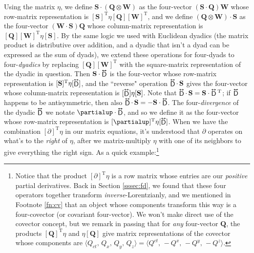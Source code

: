 \documentclass[12pt]{article}
\renewcommand{\vv}[1]{\mathbf{#1}}
\newcommand{\tightoverset}[2]{%
  \mathop{#2}\limits^{\vbox to -.5ex{\kern-0.75ex\hbox{$#1$}\vss}}}
\newcommand{\inlinedy}[1]{\tightoverset{\text{\tiny$\bm\leftrightarrow$}}{#1}}
\begin{document}
Using the matrix $\eta$, we define $\vv S \cdot (\vv Q \otimes \vv W)$ as the four-vector $(\vv S \cdot \vv Q) \vv W$ whose row-matrix representation is $[\vv S]^\mathrm{T} \eta [\vv Q] [\vv W]^\mathrm{T}$, and we define $(\vv Q \otimes \vv W) \cdot \vv S$ as the four-vector $(\vv W \cdot \vv S) \vv Q$ whose column-matrix representation is $[\vv Q] [\vv W]^\mathrm{T} \eta [\vv S]$. By the same logic we used with Euclidean dyadics (the matrix product is distributive over addition, and a dyadic that isn't a dyad can be expressed as the sum of dyads), we extend these operations for four-dyads to four-\emph{dyadics} by replacing $[\vv Q][\vv W]^{\textrm{T}}$ with the square-matrix representation of the dyadic in question. Then $\vv S \cdot \inlinedy{\mathsf{D}}$ is the four-vector whose row-matrix representation is $[\vv S]^{\mathrm{T}} \eta [\inlinedy{\mathsf{D}}]$, and the ``reverse" operation $\inlinedy{\mathsf{D}} \cdot \, \vv S$ gives the four-vector whose column-matrix representation is $[\inlinedy{\mathsf{D}}] \eta [\vv S]$. Note that $\inlinedy{\mathsf{D}} \cdot \, \vv S = \vv S \cdot \inlinedy{\mathsf{D}} {}^\mathrm{T}$; if $\inlinedy{\mathsf{D}}$ happens to be antisymmetric, then also $\inlinedy{\mathsf{D}} \cdot \, \vv S = - \vv S \cdot \inlinedy{\mathsf{D}}$. The four-\emph{divergence} of the dyadic $\inlinedy{\mathsf{D}}$ we notate $\partialup \cdot \inlinedy{\mathsf{D}}$, and so we define it as the four-vector whose row-matrix representation is $[\partialup]^{\mathrm{T}} \eta [\inlinedy{\mathsf{D}}]$. When we have the combination $[\partialup]^\mathrm{T} \eta$ in our matrix equations, it's understood that $\partialup$ operates on what's to the \emph{right} of $\eta$, after we matrix-multiply $\eta$ with one of its neighbors to give everything the right sign. As a quick example:\footnote{Notice that the product $[\partialup]^\mathrm{T} \eta$ is a row matrix whose entries are our \emph{positive} partial derivatives. Back in Section \ref{sssec:fd}, we found that these four operators together transform \emph{inverse}-Lorentzianly, and we mentioned in Footnote \ref{fn:cv} that an object whose components transform this way is a four-covector (or covariant four-vector). We won't make direct use of the covector concept, but we remark in passing that for \emph{any} four-vector $\vv Q$, the products $[\vv Q]^\mathrm{T} \eta$ and $\eta [\vv Q]$ give matrix representations of the covector whose components are $\langle Q_{ct}, \, Q_x, \, Q_y, \, Q_z \rangle = \langle Q^{ct}, \, -Q^x, \, -Q^y, \, -Q^z \rangle$.}
\end{document}
